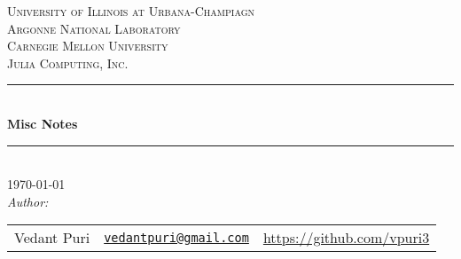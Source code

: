 %
\newcommand{\HRule}{\rule{\linewidth}{0.5mm}}
\center
\textsc{\LARGE University of Illinois at Urbana-Champiagn}\\[1cm]
\textsc{\LARGE Argonne National Laboratory}\\[1cm]
\textsc{\LARGE Carnegie Mellon University}\\[1cm]
\textsc{\LARGE Julia Computing, Inc.}\\[1cm]
\HRule \\[0.4cm]

{ 
  \huge \bfseries Misc Notes \\[0.5cm]
}

\HRule \\[1cm]
{\Large \today}\\[1cm]
\emph{Author:}\\
\begin{tabular}{l r l}
  Vedant Puri         & \href{mailto:vedantpuri@gmail.com}{\texttt{vedantpuri@gmail.com}}  &  \url{https://github.com/vpuri3} \\
\end{tabular}\\[0.5cm]

\vfill
